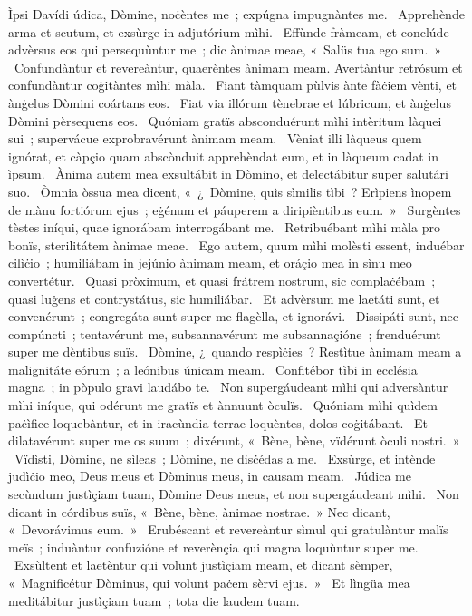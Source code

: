 { Ìpsi Davídi}
{%
údica, Dòmine, noċèntes me~; expúgna impugnàntes me. 
~Apprehènde arma et scutum, et exsùrge in adjutórium mìhi. 
~Effùnde fràmeam, et conclúde advèrsus eos qui persequùntur me~; dic ànimae meae, «~Salüs tua ego sum.~»
~Confundàntur et revereàntur, quaerèntes ànimam meam. Avertàntur retrósum et confundàntur coġitàntes mìhi màla. 
~Fiant tàmquam pùlvis ànte fàċiem vènti, et ànġelus Dòmini coártans eos. 
~Fiat via illórum tènebrae et lúbricum, et ànġelus Dòmini pèrsequens eos. 
~Quóniam gratïs absconduérunt mìhi intèritum làquei sui~; supervácue exprobravérunt ànimam meam. 
~Vèniat illi làqueus quem ignórat, et càpçio quam abscònduit apprehèndat eum, et in làqueum cadat in ìpsum. 
~Ànima autem mea exsultábit in Dòmino, et delectábitur super salutári suo. 
~Òmnia òssua mea dicent, «~¿~Dòmine, quìs sìmilis tìbi~? Erìpiens ìnopem de mànu fortiórum ejus~; eġénum et páuperem a diripièntibus eum.~» 
~Surgèntes tèstes iníqui, quae ignorábam interrogábant me. 
~Retribuébant mìhi màla pro bonïs, sterilitátem ànimae meae. 
~Ego autem, quum mìhi molèsti essent, induébar cilìċio~; humiliábam in jejúnio ànimam meam, et oráçio mea in sìnu meo convertétur. 
~Quasi pròximum, et quasi frátrem nostrum, sic complaċébam~; quasi luġens et contrystátus, sic humiliábar. 
~Et advèrsum me laetáti sunt, et convenérunt~; congregáta sunt super me flagèlla, et ignorávi. 
~Dissipáti sunt, nec compúncti~; tentavérunt me, subsannavérunt me subsannaçióne~; frenduérunt super me dèntibus suïs. 
~Dòmine, ¿~quando respìċies~? Restìtue ànimam meam a malignitáte eórum~; a leónibus únicam meam. 
~Confitébor tìbi in ecclésia magna~; in pòpulo gravi laudábo te. 
~Non supergáudeant mìhi qui adversàntur mìhi iníque, qui odérunt me gratïs et ànnuunt òculïs. 
~Quóniam mìhi quìdem paċìfice loquebàntur, et in iracùndia terrae loquèntes, dolos coġitábant. 
~Et dilatavérunt super me os suum~; dixérunt, «~Bène, bène, vïdérunt òculi nostri.~»
~Vïdìsti, Dòmine, ne sìleas~; Dòmine, ne disċédas a me. 
~Exsùrge, et intènde judìċio meo, Deus meus et Dòminus meus, in causam meam. 
~Júdica me secùndum justìçiam tuam, Dòmine Deus meus, et non supergáudeant mìhi. 
~Non dicant in córdibus suïs, «~Bène, bène, ànimae nostrae.~» Nec dicant, «~Devorávimus eum.~»
~Erubéscant et revereàntur sìmul qui gratulàntur malïs meïs~; induàntur confuzióne et reverènçia qui magna loquùntur super me. 
~Exsùltent et laetèntur qui volunt justìçiam meam, et dicant sèmper, «~Magnificétur Dòminus, qui volunt paċem sèrvi ejus.~»
~Et lìngüa mea meditábitur justìçiam tuam~; tota die laudem tuam. 
}
